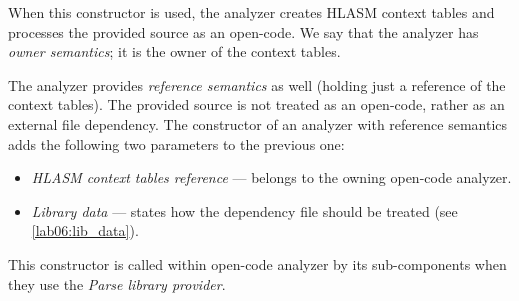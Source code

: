 When this constructor is used, the analyzer creates HLASM context tables and processes the provided source as an open-code. We say that the analyzer has \emph{owner semantics}; it is the owner of the context tables. 
 
The analyzer provides \emph{reference semantics} as well (holding just a reference of the context tables). The provided source is not treated as an open-code, rather as an external file dependency. The constructor of an analyzer with reference semantics adds the following two parameters to the previous one:
\begin{itemize}
	\item \emph{HLASM context tables reference} --- belongs to the owning open-code analyzer.
	\item \emph{Library data} --- states how the dependency file should be treated (see \cref{lab06:lib_data}).
\end{itemize}

This constructor is called within open-code analyzer by its sub-components when they use the \emph{Parse library provider}.

